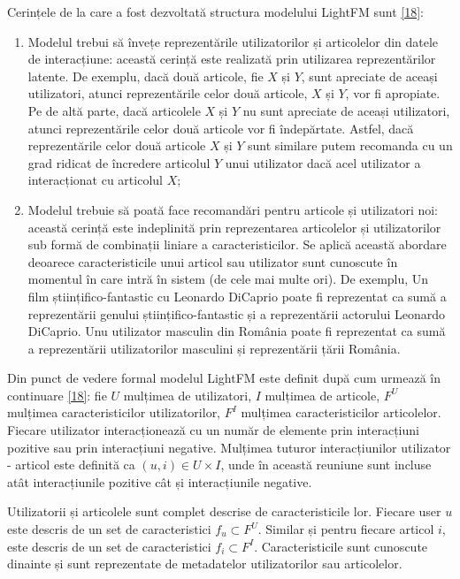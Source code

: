\vspace{5mm}
Cerințele de la care a fost dezvoltată structura modelului LightFM sunt \hyperlink{maciejlightfm}{[18]}:
\begin{enumerate}
	\item Modelul trebui să învețe reprezentările utilizatorilor și articolelor din datele de interacțiune: această cerință este realizată prin utilizarea reprezentărilor latente. De exemplu, dacă două articole, fie $X$ și $Y$, sunt apreciate de aceași utilizatori, atunci reprezentările celor două articole, $X$ și $Y$, vor fi apropiate. Pe de altă parte, dacă articolele $X$ și $Y$ nu sunt apreciate de aceași utilizatori, atunci reprezentările celor două articole vor fi îndepărtate. Astfel, dacă reprezentările celor două articole $X$ și $Y$ sunt similare putem recomanda cu un grad ridicat de încredere articolul $Y$ unui utilizator dacă acel utilizator a interacționat cu articolul $X$;
	\item Modelul trebuie să poată face recomandări pentru articole și utilizatori noi: această cerință este indeplinită prin reprezentarea articolelor și utilizatorilor sub formă de combinații liniare a caracteristicilor. Se aplică această abordare deoarece caracteristicile unui articol sau utilizator sunt cunoscute în momentul în care intră în sistem (de cele mai multe ori). De exemplu, Un film științifico-fantastic cu Leonardo DiCaprio poate fi reprezentat ca sumă a reprezentării genului științifico-fantastic și a reprezentării actorului Leonardo DiCaprio. Unu utilizator masculin din România poate fi reprezentat ca sumă a reprezentării utilizatorilor masculini și reprezentării țării România.
\end{enumerate}

\vspace{5mm}
Din punct de vedere formal modelul LightFM este definit după cum urmează în continuare \hyperlink{maciejlightfm}{[18]}: fie $U$ mulțimea de utilizatori, $I$ mulțimea de articole, $F^U$ mulțimea caracteristicilor utilizatorilor, $F^I$ mulțimea caracteristicilor articolelor. Fiecare utilizator interacționează cu un număr de elemente prin interacțiuni pozitive sau prin interacțiuni negative. Mulțimea tuturor interacțiunilor utilizator - articol este definită ca $(u,i) \in U \times I$, unde în această reuniune sunt incluse atât interacțiunile pozitive cât și interacțiunile negative.

Utilizatorii și articolele sunt complet descrise de caracteristicile lor. Fiecare user $u$ este descris de un set de caracteristici $f_u \subset F^U$. Similar și pentru fiecare articol $i$, este descris de un set de caracteristici $f_i \subset F^I$. Caracteristicile sunt cunoscute dinainte și sunt reprezentate de metadatelor utilizatorilor sau articolelor.

